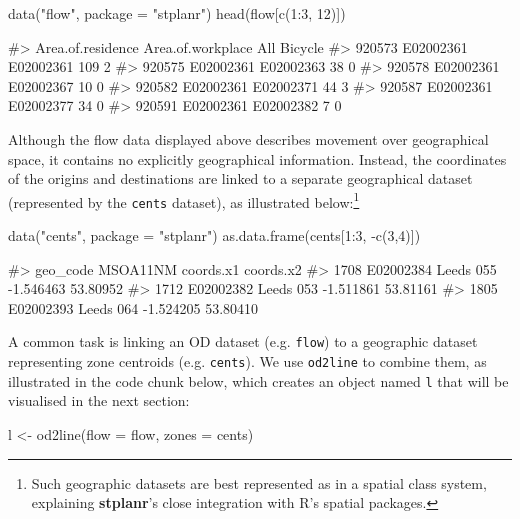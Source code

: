 \begin{Schunk}
\begin{Sinput}
data("flow", package = "stplanr")
head(flow[c(1:3, 12)])
\end{Sinput}
\begin{Soutput}
#>        Area.of.residence Area.of.workplace All Bicycle
#> 920573         E02002361         E02002361 109       2
#> 920575         E02002361         E02002363  38       0
#> 920578         E02002361         E02002367  10       0
#> 920582         E02002361         E02002371  44       3
#> 920587         E02002361         E02002377  34       0
#> 920591         E02002361         E02002382   7       0
\end{Soutput}
\end{Schunk}

Although the flow data displayed above describes movement over
geographical space, it contains no explicitly geographical information.
Instead, the coordinates of the origins and destinations are linked to a
separate geographical dataset (represented by the \texttt{cents} dataset),
as illustrated below:\footnote{Such geographic datasets are best represented as in a spatial class system, explaining
\textbf{stplanr}'s close integration with R's spatial packages.}


\begin{Schunk}
\begin{Sinput}
data("cents", package = "stplanr")
as.data.frame(cents[1:3, -c(3,4)])
\end{Sinput}
\begin{Soutput}
#>       geo_code  MSOA11NM coords.x1 coords.x2
#> 1708 E02002384 Leeds 055 -1.546463  53.80952
#> 1712 E02002382 Leeds 053 -1.511861  53.81161
#> 1805 E02002393 Leeds 064 -1.524205  53.80410
\end{Soutput}
\end{Schunk}

A common task is linking an OD dataset (e.g. \texttt{flow}) to a geographic dataset
representing zone centroids (e.g. \texttt{cents}).
We use \texttt{od2line} to combine them, as illustrated in the code chunk below,
which creates an object named \texttt{l} that will be visualised
in the next section:

\begin{Schunk}
\begin{Sinput}
l <- od2line(flow = flow, zones = cents)
\end{Sinput}
\end{Schunk}

